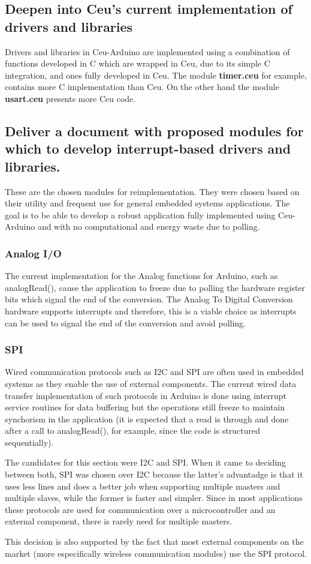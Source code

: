 \documentclass{article}
\begin{document}
\subsection{Deepen into Ceu's current implementation of drivers and libraries}
\tab Drivers and libraries in Ceu-Arduino are implemented using a combination of functions developed in C which are wrapped in Ceu, due to its simple C integration, and ones fully developed in Ceu. The module \textbf{timer.ceu} for example, contains more C implementation than Ceu. On the other hand the module \textbf{usart.ceu} presents more Ceu code.
\subsection{Deliver a document with proposed modules for which to develop interrupt-based drivers and libraries.}
\tab These are the chosen modules for reimplementation. They were chosen based on their utility and frequent use for general embedded systems applications. The goal is to be able to develop a robust application fully implemented using Ceu-Arduino and with no computational and energy waste due to polling.
\subsubsection{Analog I/O}
\tab The current implementation for the Analog functions for Arduino, such as analogRead(), cause the application to freeze due to polling the hardware register bits which signal the end of the conversion. The Analog To Digital Conversion hardware supports interrupts and therefore, this is a viable choice as interrupts can be used to signal the end of the conversion and avoid polling.
\subsubsection{SPI}
\tab Wired communication protocols such as I2C and SPI are often used in embedded systems as they enable the use of external components. The current wired data transfer implementation of such protocols in Arduino is done using interrupt service routines for data buffering but the operations still freeze to maintain synchorism in the application (it is expected that a read is through and done after a call to analogRead(), for example, since the code is structured sequentially).
\par The candidates for this section were I2C and SPI. When it came to deciding between both, SPI was chosen over I2C because the latter's advantadge is that it uses less lines and does a better job when supporting multiple masters and multiple slaves, while the former is faster and simpler. Since in most applications these protocols are used for communication over a microcontroller and an external component, there is rarely need for multiple masters. 
\par This decision is also supported by the fact that most external components on the market (more especifically wireless communication modules) use the SPI protocol.
\end{document}
